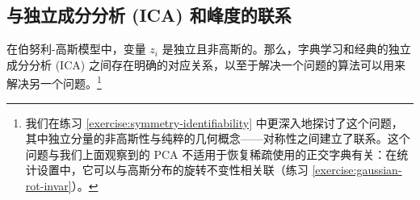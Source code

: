 \documentclass[../../book-main_zh.tex]{subfiles}
\begin{document}


%
%
%
%



\subsection{与独立成分分析 (ICA) 和峰度的联系}
在伯努利-高斯模型中，变量 $z_i$ 是独立且非高斯的。那么，字典学习和经典的独立成分分析 (ICA) 之间存在明确的对应关系，以至于解决一个问题的算法可以用来解决另一个问题。\footnote{我们在练习 \ref{exercise:symmetry-identifiability} 中更深入地探讨了这个问题，其中独立分量的非高斯性与纯粹的几何概念——对称性之间建立了联系。这个问题与我们上面观察到的 PCA 不适用于恢复稀疏使用的正交字典有关：在统计设置中，它可以与高斯分布的旋转不变性相关联（练习 \ref{exercise:gaussian-rot-invar}）。} 
\end{document}
